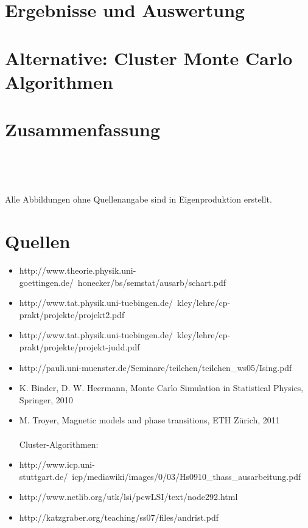 \documentclass[12pt,a4paper, german]{article}
\begin{document}
\section{Ergebnisse und Auswertung}

\newpage
\section{Alternative: Cluster Monte Carlo Algorithmen}
\label{cluster}

\newpage
\section{Zusammenfassung}

\newpage
\listoffigures

\

\

Alle Abbildungen ohne Quellenangabe sind in Eigenproduktion erstellt.


\section*{Quellen}
\begin{itemize}
\item http://www.theorie.physik.uni-goettingen.de/~honecker/bs/semstat/ausarb/schart.pdf
\item http://www.tat.physik.uni-tuebingen.de/~kley/lehre/cp-prakt/projekte/projekt2.pdf
\item http://www.tat.physik.uni-tuebingen.de/~kley/lehre/cp-prakt/projekte/projekt-judd.pdf
\item http://pauli.uni-muenster.de/Seminare/teilchen/teilchen\_ws05/Ising.pdf
\item K. Binder, D. W. Heermann, Monte Carlo Simulation in Statistical Physics, Springer, 2010
\item M. Troyer, Magnetic models and phase transitions, ETH Zürich, 2011\\\\
Cluster-Algorithmen:
\item http://www.icp.uni-stuttgart.de/~icp/mediawiki/images/0/03/Hs0910\_thass\_ausarbeitung.pdf
\item http://www.netlib.org/utk/lsi/pcwLSI/text/node292.html
\item http://katzgraber.org/teaching/ss07/files/andrist.pdf
\end{itemize}
\newpage
\end{document}
